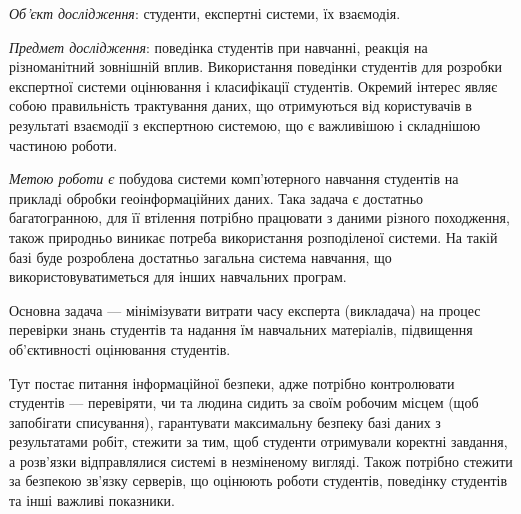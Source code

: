 


\textit{Об’єкт дослідження}:
студенти, експертні системи, їх взаємодія.

\textit{Предмет дослідження}:
поведінка студентів при навчанні, реакція на різноманітний зовнішній вплив.
Використання поведінки студентів для розробки експертної системи оцінювання
і класифікації студентів.
Окремий інтерес являє собою правильність трактування даних,
що отримуються від користувачів в результаті взаємодії з експертною системою,
що є важливішою і складнішою частиною роботи.

\textit{Метою роботи є}
побудова системи комп’ютерного навчання студентів на прикладі обробки
геоінформаційних даних.
Така задача є достатньо багатогранною, для її втілення потрібно працювати
з даними різного походження, також природньо виникає потреба використання
розподіленої системи.
На такій базі буде розроблена достатньо загальна система навчання,
що використовуватиметься для інших навчальних програм.

Основна задача --- мінімізувати витрати часу експерта (викладача) на процес
перевірки знань студентів та надання їм навчальних матеріалів,
підвищення об’єктивності оцінювання студентів.

Тут постає питання інформаційної безпеки, адже потрібно контролювати студентів
--- перевіряти, чи та людина сидить за своїм робочим місцем (щоб запобігати
списування), гарантувати максимальну безпеку базі даних з результатами робіт,
стежити за тим, щоб студенти отримували коректні завдання,
а розв’язки відправлялися системі в незміненому вигляді.
Також потрібно стежити за безпекою зв’язку серверів, що оцінюють роботи
студентів, поведінку студентів та інші важливі показники.
